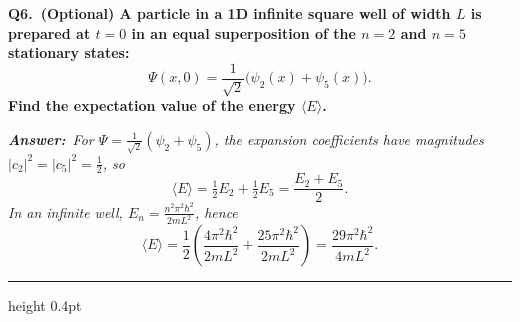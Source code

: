 \documentclass[11pt]{article}
\newcommand{\QuestionStyle}[1]{{\large\bfseries\boldmath #1}}
\newcommand{\OEBlock}[3]{%
  \Needspace{5\baselineskip}%
  \noindent
  \begin{minipage}{\linewidth}
    \QuestionStyle{#1.~#2}

    \vspace{0.25em}
    \noindent\textit{\textbf{Answer:}~#3}

    \vspace{0.25em}
    \hrule height 0.4pt
  \end{minipage}
  \vspace{0.75em}
}
\begin{document}
\OEBlock{Q6}{(Optional) A particle in a 1D infinite square well of width \(L\) is prepared at \(t=0\) in an equal superposition of the \(n=2\) and \(n=5\) stationary states:
\[
\Psi(x,0)=\frac{1}{\sqrt{2}}\big(\psi_2(x)+\psi_5(x)\big).
\]
Find the expectation value of the energy \(\langle E\rangle\).}{For \(\Psi=\frac{1}{\sqrt{2}}(\psi_2+\psi_5)\), the expansion coefficients have magnitudes \(|c_2|^2=|c_5|^2=\tfrac12\), so
\[\langle E\rangle=\tfrac12 E_2+\tfrac12 E_5=\frac{E_2+E_5}{2}.\]
In an infinite well, \(E_n=\frac{n^2\pi^2\hbar^2}{2mL^2}\), hence
\[\langle E\rangle=\frac{1}{2}\left(\frac{4\pi^2\hbar^2}{2mL^2}+\frac{25\pi^2\hbar^2}{2mL^2}\right)=\frac{29\pi^2\hbar^2}{4mL^2}.\]}
\end{document}

